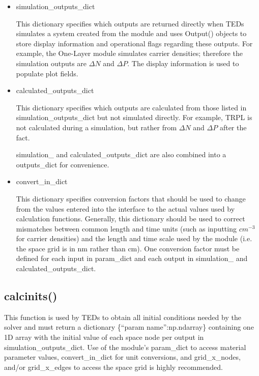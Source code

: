 \documentclass[11pt,letterpaper,titlepage]{article}
\begin{document}
\begin{itemize}
			\item simulation\_outputs\_dict
			\par This dictionary specifies which outputs are returned directly when TEDs simulates a system created from the module and uses Output() objects to store display information and operational flags regarding these outputs. For example, the One-Layer module simulates carrier densities; therefore the simulation outputs are $\Delta N$ and $\Delta P$. The display information is used to populate plot fields.
			
			\item calculated\_outputs\_dict
			\par This dictionary specifies which outputs are calculated from those listed in simulation\_outputs\_dict but not simulated directly. For example, TRPL is not calculated during a simulation, but rather from $\Delta N$ and $\Delta P$ after the fact.
			
			\par simulation\_ and calculated\_outputs\_dict are also combined into a outputs\_dict for convenience.
			
			\item convert\_in\_dict
			\par This dictionary specifies conversion factors that should be used to change from the values entered into the interface to the actual values used by calculation functions. Generally, this dictionary should be used to correct mismatches between common length and time units (such as inputting $cm^{-3}$ for carrier densities) and the length and time scale used by the module (i.e. the space grid is in nm rather than cm). One conversion factor must be defined for each input in param\_dict and each output in simulation\_ and calculated\_outputs\_dict.
		\end{itemize}
	
		\subsection{calc\textunderscore inits()}
		\par This function is used by TEDs to obtain all initial conditions needed by the solver and must return a dictionary \{“param name”:np.ndarray\} containing one 1D array with the initial value of each space node per output in simulation\_outputs\_dict. Use of the module’s param\_dict to access material parameter values, convert\_in\_dict for unit conversions, and grid\_x\_nodes, and/or grid\_x\_edges to access the space grid is highly recommended.
		
\end{document}
